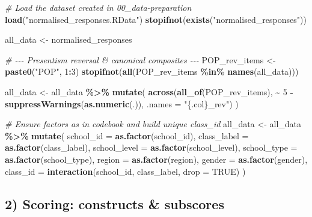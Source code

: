 \documentclass[
  10pt,
]{article}
\newenvironment{Shaded}{\begin{snugshade}}{\end{snugshade}}
\newcommand{\AttributeTok}[1]{\textcolor[rgb]{0.13,0.29,0.53}{#1}}
\newcommand{\CommentTok}[1]{\textcolor[rgb]{0.56,0.35,0.01}{\textit{#1}}}
\newcommand{\ConstantTok}[1]{\textcolor[rgb]{0.56,0.35,0.01}{#1}}
\newcommand{\DecValTok}[1]{\textcolor[rgb]{0.00,0.00,0.81}{#1}}
\newcommand{\FunctionTok}[1]{\textcolor[rgb]{0.13,0.29,0.53}{\textbf{#1}}}
\newcommand{\NormalTok}[1]{#1}
\newcommand{\OtherTok}[1]{\textcolor[rgb]{0.56,0.35,0.01}{#1}}
\newcommand{\SpecialCharTok}[1]{\textcolor[rgb]{0.81,0.36,0.00}{\textbf{#1}}}
\newcommand{\StringTok}[1]{\textcolor[rgb]{0.31,0.60,0.02}{#1}}
\begin{document}
\begin{Shaded}
\begin{Highlighting}[]
\CommentTok{\# Load the dataset created in 00\_data{-}preparation}
\FunctionTok{load}\NormalTok{(}\StringTok{"normalised\_responses.RData"}\NormalTok{)}
\FunctionTok{stopifnot}\NormalTok{(}\FunctionTok{exists}\NormalTok{(}\StringTok{"normalised\_responses"}\NormalTok{))}

\NormalTok{all\_data }\OtherTok{\textless{}{-}}\NormalTok{ normalised\_responses}

\CommentTok{\# {-}{-}{-} Presentism reversal \& canonical composites {-}{-}{-}}
\NormalTok{POP\_rev\_items }\OtherTok{\textless{}{-}} \FunctionTok{paste0}\NormalTok{(}\StringTok{"POP"}\NormalTok{, }\DecValTok{1}\SpecialCharTok{:}\DecValTok{3}\NormalTok{)}
\FunctionTok{stopifnot}\NormalTok{(}\FunctionTok{all}\NormalTok{(POP\_rev\_items }\SpecialCharTok{\%in\%} \FunctionTok{names}\NormalTok{(all\_data)))}

\NormalTok{all\_data }\OtherTok{\textless{}{-}}\NormalTok{ all\_data }\SpecialCharTok{\%\textgreater{}\%}
  \FunctionTok{mutate}\NormalTok{(}
    \FunctionTok{across}\NormalTok{(}\FunctionTok{all\_of}\NormalTok{(POP\_rev\_items), }\SpecialCharTok{\textasciitilde{}} \DecValTok{5} \SpecialCharTok{{-}} \FunctionTok{suppressWarnings}\NormalTok{(}\FunctionTok{as.numeric}\NormalTok{(.)),}
           \AttributeTok{.names =} \StringTok{"\{.col\}\_rev"}\NormalTok{)}
\NormalTok{  )}

\CommentTok{\# Ensure factors as in codebook and build unique class\_id}
\NormalTok{all\_data }\OtherTok{\textless{}{-}}\NormalTok{ all\_data }\SpecialCharTok{\%\textgreater{}\%}
  \FunctionTok{mutate}\NormalTok{(}
    \AttributeTok{school\_id    =} \FunctionTok{as.factor}\NormalTok{(school\_id),}
    \AttributeTok{class\_label  =} \FunctionTok{as.factor}\NormalTok{(class\_label),}
    \AttributeTok{school\_level =} \FunctionTok{as.factor}\NormalTok{(school\_level),}
    \AttributeTok{school\_type  =} \FunctionTok{as.factor}\NormalTok{(school\_type),}
    \AttributeTok{region       =} \FunctionTok{as.factor}\NormalTok{(region),}
    \AttributeTok{gender       =} \FunctionTok{as.factor}\NormalTok{(gender),}
    \AttributeTok{class\_id     =} \FunctionTok{interaction}\NormalTok{(school\_id, class\_label, }\AttributeTok{drop =} \ConstantTok{TRUE}\NormalTok{)}
\NormalTok{  )}
\end{Highlighting}
\end{Shaded}

\hypertarget{scoring-constructs-subscores}{%
\subsection{2) Scoring: constructs \&
subscores}\label{scoring-constructs-subscores}}
\end{document}
